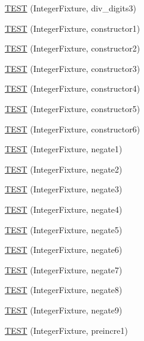 \begin{DoxyCompactItemize}
\item 
\hyperlink{_test_integer_8c_09_09_a38701867e1279f1e3df70e6df8aeb75c}{T\-E\-S\-T} (Integer\-Fixture, div\-\_\-digits3)
\item 
\hyperlink{_test_integer_8c_09_09_a1b140f760e0154dec7c865f1c560a0c1}{T\-E\-S\-T} (Integer\-Fixture, constructor1)
\item 
\hyperlink{_test_integer_8c_09_09_a6674145d83b6de2a1b7ee7a3292c6b87}{T\-E\-S\-T} (Integer\-Fixture, constructor2)
\item 
\hyperlink{_test_integer_8c_09_09_a8b63e069d1a32d07d38c28261a58b647}{T\-E\-S\-T} (Integer\-Fixture, constructor3)
\item 
\hyperlink{_test_integer_8c_09_09_acc7a021a24be9b1b7bc340818aaf0bbe}{T\-E\-S\-T} (Integer\-Fixture, constructor4)
\item 
\hyperlink{_test_integer_8c_09_09_aa2a54fc031b98b9d2265f83ee3f0d024}{T\-E\-S\-T} (Integer\-Fixture, constructor5)
\item 
\hyperlink{_test_integer_8c_09_09_a7b1d6b89b7107139cb257df6980480ef}{T\-E\-S\-T} (Integer\-Fixture, constructor6)
\item 
\hyperlink{_test_integer_8c_09_09_a8a15f6355c6285eadd22bc67359ae63e}{T\-E\-S\-T} (Integer\-Fixture, negate1)
\item 
\hyperlink{_test_integer_8c_09_09_ab9d89c4b935c78b772034c5cbdc9f329}{T\-E\-S\-T} (Integer\-Fixture, negate2)
\item 
\hyperlink{_test_integer_8c_09_09_a75e037bb7c2385946cf712879c787051}{T\-E\-S\-T} (Integer\-Fixture, negate3)
\item 
\hyperlink{_test_integer_8c_09_09_a9fb0316f6ca80da9b0ae95b32a721cd9}{T\-E\-S\-T} (Integer\-Fixture, negate4)
\item 
\hyperlink{_test_integer_8c_09_09_a9fac526c2fe42342e9c06612cbb401a3}{T\-E\-S\-T} (Integer\-Fixture, negate5)
\item 
\hyperlink{_test_integer_8c_09_09_a30819cc7db0f037d7a8c19cc4239bd37}{T\-E\-S\-T} (Integer\-Fixture, negate6)
\item 
\hyperlink{_test_integer_8c_09_09_a7d3356c408dd32d46bc3400907aa2c45}{T\-E\-S\-T} (Integer\-Fixture, negate7)
\item 
\hyperlink{_test_integer_8c_09_09_ae65e6b7bb37558da7aeedb312f8c90e6}{T\-E\-S\-T} (Integer\-Fixture, negate8)
\item 
\hyperlink{_test_integer_8c_09_09_a6606563c740df8229b8988a0e3346367}{T\-E\-S\-T} (Integer\-Fixture, negate9)
\item 
\hyperlink{_test_integer_8c_09_09_a1f411d2ecb4bbe7bd8e3268414fa3dc4}{T\-E\-S\-T} (Integer\-Fixture, preincre1)

\end{DoxyCompactItemize}
